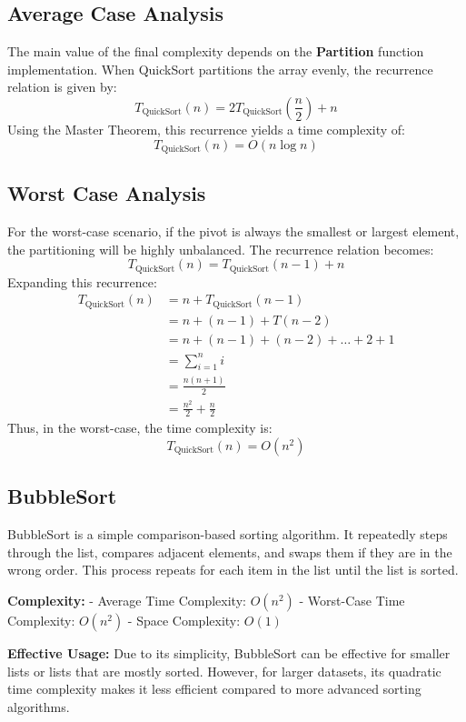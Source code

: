 \subsection{Average Case Analysis}
The main value of the final complexity depends on the \textbf{Partition} function implementation.
When QuickSort partitions the array evenly, the recurrence relation is given by:
\[
T_{\text{QuickSort}}(n) = 2T_{\text{QuickSort}}\left(\frac{n}{2}\right) + n
\]
Using the Master Theorem, this recurrence yields a time complexity of:
\[
T_{\text{QuickSort}}(n) = O(n \log n)
\]

\subsection{Worst Case Analysis}
For the worst-case scenario, if the pivot is always the smallest or largest element, the partitioning will be highly unbalanced. The recurrence relation becomes:
\[
T_{\text{QuickSort}}(n) = T_{\text{QuickSort}}(n-1) + n
\]
Expanding this recurrence:
\begin{align*}
T_{\text{QuickSort}}(n) & = n + T_{\text{QuickSort}}(n-1) \\
& = n + (n-1) + T(n-2) \\
& = n + (n-1) + (n-2) + \dots + 2 + 1 \\
& = \sum_{i=1}^{n} i \\
& = \frac{n(n+1)}{2} \\
& = \frac{n^2}{2} + \frac{n}{2}
\end{align*}
Thus, in the worst-case, the time complexity is:
\[
T_{\text{QuickSort}}(n) = O(n^2)
\]

\subsection{BubbleSort}

BubbleSort is a simple comparison-based sorting algorithm. It repeatedly steps through the list, compares adjacent elements, and swaps them if they are in the wrong order. This process repeats for each item in the list until the list is sorted.


\textbf{Complexity:}
- Average Time Complexity: \(O(n^2)\)
- Worst-Case Time Complexity: \(O(n^2)\)
- Space Complexity: \(O(1)\)

\textbf{Effective Usage:}
Due to its simplicity, BubbleSort can be effective for smaller lists or lists that are mostly sorted. However, for larger datasets, its quadratic time complexity makes it less efficient compared to more advanced sorting algorithms.


